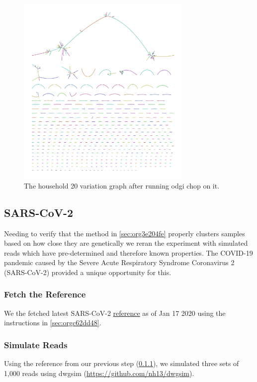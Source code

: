 \documentclass[10pt, a4paper]{article}
\begin{document}
\begin{figure}[h!]
\centering
\includegraphics[width=0.75\textwidth]{../Figures/RSV/Assembly_Bluntified.png}
\caption[RSV Variation Graph]{\label{fig:orgd339b18}
The household 20 variation graph after running odgi chop on it.}
\end{figure}

\clearpage
\subsection{SARS-CoV-2}
\label{sec:orga554126}
Needing to verify that the method in \ref{sec:org3e204fe} properly clusters samples based on 
how close they are genetically we reran the experiment with simulated reads
which have pre-determined and therefore known properties.
The COVID-19 pandemic caused by the Severe Acute Respiratory Syndrome
Coronavirus 2 (SARS-CoV-2) provided a unique opportunity for this. 

\subsubsection{Fetch the Reference}
\label{sec:org30b76c9}
We the fetched latest SARS-CoV-2 \href{https://www.ncbi.nlm.nih.gov/nuccore/1798174254}{reference} as of Jan 17 2020 using the instructions
in \ref{sec:orgc62dd48}.

\subsubsection{Simulate Reads}
\label{sec:org1456132}
Using the reference from our previous step (\ref{sec:org30b76c9}), we simulated 
three sets of 1,000 reads using dwgsim (\url{https://github.com/nh13/dwgsim}).
\end{document}
